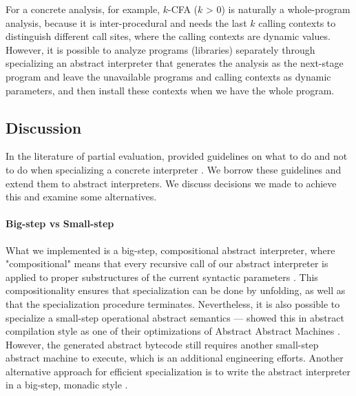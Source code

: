 For a concrete analysis, for example, $k$-CFA ($k$ > 0) is naturally a
whole-program analysis, because it is inter-procedural and needs the last $k$
calling contexts to distinguish different call sites, where the calling contexts
are dynamic values. However, it is possible to analyze programs (libraries)
separately through specializing an abstract interpreter that generates the
analysis as the next-stage program and leave the unavailable programs and
calling contexts as dynamic parameters, and then install these contexts when we
have the whole program.

\iffalse
Another perspective: programs are data for an abstract interpreter, so if we
have $n$ programs, then maybe there can be $n$ stages. Probably we can analyze
first $m$ programs, and generate a residual abstract interpreter waiting for the
rest $(n-m)$ programs. These $(n-m)$ programs might be (abstract) arguments for
the first $n$ programs, and the abstract interpreter itself might be a partial
abstract interpreter.
\fi

\subsection{Discussion}

In the literature of partial evaluation, \citeauthor{10.1007/3-540-61580-6_11}
provided guidelines on what to do and not to do when specializing a concrete
interpreter \cite{10.1007/3-540-61580-6_11}. We borrow these guidelines and
extend them to abstract interpreters. We discuss decisions we made to achieve
this and examine some alternatives.

\paragraph{Big-step vs Small-step}

What we implemented is a big-step, compositional abstract interpreter, where
"compositional" means that every recursive call of our abstract interpreter is
applied to proper substructures of the current syntactic parameters
\cite{10.1007/3-540-61580-6_11}. This compositionality ensures that
specialization can be done by unfolding, as well as that the specialization
procedure terminates. Nevertheless, it is also possible to specialize a
small-step operational abstract semantics ---
\citeauthor{Johnson:2013:OAA:2500365.2500604} showed this in abstract
compilation \cite{Boucher:1996:ACN:647473.727587} style as one of their
optimizations of Abstract Abstract Machines
\cite{Johnson:2013:OAA:2500365.2500604}. However, the generated abstract
bytecode still requires another small-step abstract machine to execute, which is
an additional engineering efforts. Another alternative approach for efficient
specialization is to write the abstract interpreter in a big-step, monadic style
\cite{DBLP:journals/pacmpl/DaraisLNH17}.

